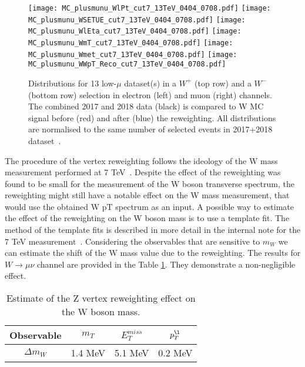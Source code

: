 \begin{figure}[tph]
	\centering
	\texttt{[image: MC\_plusmunu\_WlPt\_cut7\_13TeV\_0404\_0708.pdf]}%
	\texttt{[image: MC\_plusmunu\_WSETUE\_cut7\_13TeV\_0404\_0708.pdf]}
	\texttt{[image: MC\_plusmunu\_WlEta\_cut7\_13TeV\_0404\_0708.pdf]}%
	\texttt{[image: MC\_plusmunu\_WmT\_cut7\_13TeV\_0404\_0708.pdf]}
	\texttt{[image: MC\_plusmunu\_Wmet\_cut7\_13TeV\_0404\_0708.pdf]}%
	\texttt{[image: MC\_plusmunu\_WWpT\_Reco\_cut7\_13TeV\_0404\_0708.pdf]}
	\caption{Distributions for 13 \TeV{} 
		low-$\mu$ dataset(s) in a $W^{+}$ (top row) and a $W^{-}$ (bottom row)
		selection in electron (left) and muon (right) channels. The combined 2017 and 2018 data (black) is compared to W MC signal before (red) and after (blue) the reweighting.
		All distributions are normalised to the same number of
		selected events in 2017+2018 dataset~\cite{int_note_samples}.}
	\label{fig:observables_wzvtx}
\end{figure}

The procedure of the vertex reweighting follows the ideology of the W mass measurement performed at 7 TeV~\cite{wboson}. Despite the effect of the reweighting was found to be small for the measurement of the W boson transverse spectrum, the reweighting might still have a notable effect on the W mass measurement, that would use the obtained W pT spectrum as an input. 
A possible way to estimate the effect of the reweighting on the W boson mass is to use a template fit. The method of the template fits is described in more detail in the internal note for the 7 TeV measurement~\cite{Wmass7TeVIntNote}. Considering the observables that are sensitive to $m_W$ we can estimate the shift of the W mass value due to the reweighting. The results for $W\rightarrow \mu \nu$ channel are provided in the Table \ref{tab::z_vert_template}. They demonstrate a non-negligible effect.
\begin{table}
\centering
\begin{tabular}{|c| c| c| c|}
	\hline
	Observable & $m_T$ & $E_T^{miss}$  & $p_T^{\l}$ \\
	\hline
	$\Delta m_W$& 1.4 MeV&  5.1 MeV & 0.2 MeV \\
	\hline
\end{tabular}\\
\caption{Estimate of the Z vertex reweighting effect on the W boson mass.}
\label{tab::z_vert_template}
\end{table}


